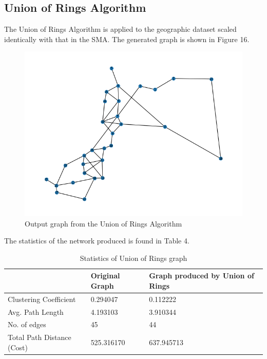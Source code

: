 \documentclass[11pt]{article}
\begin{document}
\subsection{Union of Rings Algorithm}
The Union of Rings Algorithm is applied to the geographic dataset scaled identically with that in the SMA. The generated graph is shown in Figure 16. 
\begin{figure}[H]
\centering
\includegraphics[width=\linewidth]{final.png}
\caption{Output graph from the Union of Rings Algorithm}
\end{figure}
\par
The statistics of the network produced is found in Table 4. 
\begin{table}[H]
\centering
\begin{tabular}{|l|l|l|}
\hline
                           & Original Graph & Graph produced by Union of Rings \\ \hline
Clustering Coefficient     & 0.294047       & 0.112222                         \\ \hline
Avg. Path Length           & 4.193103       & 3.910344                         \\ \hline
No. of edges               & 45             & 44                               \\ \hline
Total Path Distance (Cost) & 525.316170     & 637.945713                       \\ \hline
\end{tabular}
\caption{Statistics of Union of Rings graph}
\end{table}
\par
\end{document}
